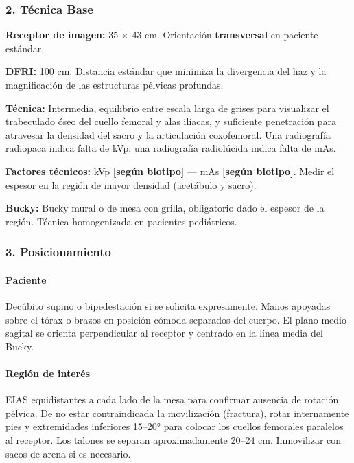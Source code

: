 	\subsubsection*{2. Técnica Base}
	
	\textbf{Receptor de imagen:} 35 $\times$ 43 cm. Orientación \textbf{transversal} en paciente estándar.
	
	\textbf{DFRI:} 100 cm. Distancia estándar que minimiza la divergencia del haz y la magnificación de las estructuras pélvicas profundas.
	
	\textbf{Técnica:} Intermedia, equilibrio entre escala larga de grises para visualizar el trabeculado óseo del cuello femoral y alas ilíacas, y suficiente penetración para atravesar la densidad del sacro y la articulación coxofemoral. Una radiografía radiopaca indica falta de kVp; una radiografía radiolúcida indica falta de mAs.
	
	\textbf{Factores técnicos:} kVp \textbf{[según biotipo]} --- mAs \textbf{[según biotipo]}. Medir el espesor en la región de mayor densidad (acetábulo y sacro).
	
	\textbf{Bucky:} Bucky mural o de mesa con grilla, obligatorio dado el espesor de la región. Técnica homogenizada en pacientes pediátricos.
	
	\subsubsection*{3. Posicionamiento}
	
	\paragraph{Paciente}
	Decúbito supino o bipedestación si se solicita expresamente. Manos apoyadas sobre el tórax o brazos en posición cómoda separados del cuerpo. El plano medio sagital se orienta perpendicular al receptor y centrado en la línea media del Bucky.
	
	\paragraph{Región de interés}
	EIAS equidistantes a cada lado de la mesa para confirmar ausencia de rotación pélvica. De no estar contraindicada la movilización (fractura), rotar internamente pies y extremidades inferiores 15--20° para colocar los cuellos femorales paralelos al receptor. Los talones se separan aproximadamente 20--24 cm. Inmovilizar con sacos de arena si es necesario.
	
